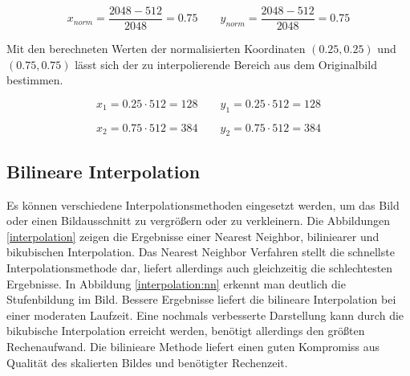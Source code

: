 \begin{equation}
 x_{norm} = \frac{2048 - 512}{2048} = 0.75\qquad
 y_{norm} = \frac{2048 - 512}{2048} = 0.75
\end{equation}

Mit den berechneten Werten der normalisierten Koordinaten $(0.25, 0.25)$ und $(0.75, 0.75)$ lässt sich der zu interpolierende Bereich aus dem Originalbild bestimmen.

\begin{equation}
 x_1 = 0.25 \cdot 512 =  128\qquad
 y_1 = 0.25 \cdot 512 =  128
\end{equation}

\begin{equation}
 x_2 = 0.75 \cdot 512 =  384\qquad
 y_2 = 0.75 \cdot 512 =  384
\end{equation}

\FloatBarrier
\subsection{Bilineare Interpolation}

Es können verschiedene Interpolationsmethoden eingesetzt werden, um das Bild oder einen Bildausschnitt zu vergrößern oder zu verkleinern. Die Abbildungen \ref{interpolation} zeigen die Ergebnisse einer Nearest Neighbor, biliniearer und bikubischen Interpolation. Das Nearest Neighbor Verfahren stellt die schnellste Interpolationsmethode dar, liefert allerdings auch gleichzeitig die schlechtesten Ergebnisse. In Abbildung \ref{interpolation:nn} erkennt man deutlich die Stufenbildung im Bild.
Bessere Ergebnisse liefert die bilineare Interpolation bei einer moderaten Laufzeit. Eine nochmals verbesserte Darstellung kann durch die bikubische Interpolation erreicht werden, benötigt allerdings den größten Rechenaufwand. Die bilinieare Methode liefert einen guten Kompromiss aus Qualität des skalierten Bildes und benötigter Rechenzeit.

